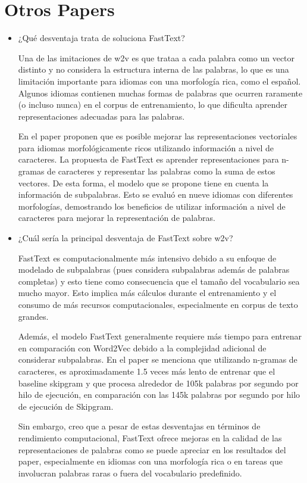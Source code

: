 \documentclass[letter, 11pt, twoside]{report}
\begin{document}
\section*{Otros Papers}
\begin{itemize}
  \item ¿Qué desventaja trata de soluciona FastText?
  

  Una de las imitaciones de w2v es que trataa a  cada palabra como un vector distinto y no considera la estructura interna de las palabras, lo que es una limitación importante para idiomas con una morfología rica, como el español.
  Algunos idiomas contienen muchas formas de palabras que ocurren raramente (o incluso nunca) en el corpus de entrenamiento, lo que dificulta aprender representaciones adecuadas para las palabras.

  En el paper proponen que es posible mejorar las representaciones vectoriales para idiomas morfológicamente ricos utilizando información a nivel de caracteres. La propuesta de FastText es aprender representaciones para n-gramas de caracteres y representar las palabras como la suma de estos vectores. De esta forma, el modelo que se propone tiene en cuenta la información de subpalabras. 
  Esto se evaluó en nueve idiomas con diferentes morfologías, demostrando los beneficios de utilizar información a nivel de caracteres para mejorar la representación de palabras.

  \item ¿Cuál sería la principal desventaja de FastText sobre w2v?
  
   FastText es computacionalmente más intensivo debido a su enfoque de modelado de subpalabras (pues considera subpalabras además de palabras completas) y esto tiene como consecuencia que el tamaño del vocabulario sea mucho mayor. Esto implica más cálculos durante el entrenamiento y el consumo de más recursos computacionales, especialmente en corpus de texto grandes.

   Además, el modelo FastText generalmente requiere más tiempo para entrenar en comparación con Word2Vec debido a la complejidad adicional de considerar subpalabras. En el paper se menciona que utilizando n-gramas de caracteres, es aproximadamente 1.5 veces más lento de entrenar que el baseline skipgram y que procesa alrededor de 105k palabras por segundo por hilo de ejecución, en comparación con las 145k palabras por segundo por hilo de ejecución de Skipgram.

   Sin embargo, creo que a pesar de estas desventajas en términos de rendimiento computacional, FastText ofrece mejoras en la calidad de las representaciones de palabras como se puede apreciar en los resultados del paper, especialmente en idiomas con una morfología rica o en tareas que involucran palabras raras o fuera del vocabulario predefinido.


\end{itemize}
\end{document}
